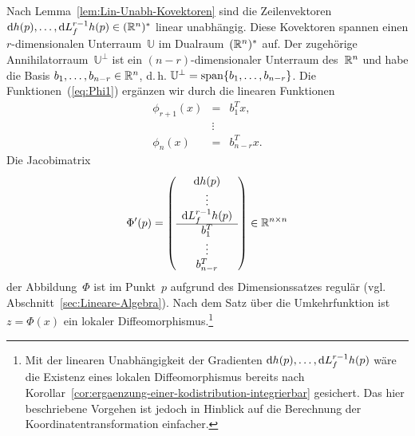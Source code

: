 \begin{svmultproof2}
Nach Lemma~\ref{lem:Lin-Unabh-Kovektoren} sind die Zeilenvektoren
${\mathrm{d}} h(p),\ldots,{\mathrm{d}} L_{f}^{r-1}h(p)\in({\mathbb{R}}^{n})^{*}$ linear unabhängig.
Diese Kovektoren spannen einen $r$-dimensionalen Unterraum~$\mathbb{U}$
im Dualraum~$({\mathbb{R}}^{n})^{*}$ auf. Der zugehörige Annihilatorraum~$\mathbb{U}^{\perp}$
ist ein $(n-r)$-dimensionaler Unterraum des~${\mathbb{R}}^{n}$ und habe die
Basis $b_{1},\ldots,b_{n-r}\in{\mathbb{R}}^{n}$, d.\,h. $\mathbb{U}^{\perp}={\operatorname{span}}\{b_{1},\ldots,b_{n-r}\}$.
Die Funktionen~(\ref{eq:Phi1}) ergänzen wir durch die linearen Funktionen
\begin{equation}
\begin{array}{rcl}
\phi_{r+1}(x) & = & b_{1}^{T}x,\\
 & \vdots\\
\phi_{n}(x) & = & b_{n-r}^{T}x.
\end{array}\label{eq:Phi2}
\end{equation}
 Die Jacobimatrix 
\[
\Phi^{\prime}(p)=\left(\begin{array}{c}
\mathrm{d} h(p)\\
\vdots\\
\mathrm{d} L_{f}^{r-1}h(p)\\
\hline b_{1}^{T}\\
\vdots\\
b_{n-r}^{T}
\end{array}\right)\in{\mathbb{R}}^{n\times n}
\]
der Abbildung~$\Phi$ ist im Punkt~$p$ aufgrund des Dimensionssatzes
regulär (vgl. Abschnitt~\ref{sec:Lineare-Algebra}). Nach dem Satz
über die Umkehrfunktion ist $z=\Phi(x)$ ein lokaler Diffeomorphismus.\footnote{Mit der linearen Unabhängigkeit der Gradienten ${\mathrm{d}} h(p),\ldots,{\mathrm{d}} L_{f}^{r-1}h(p)$
wäre die Existenz eines lokalen Diffeomorphismus bereits nach Korollar~\ref{cor:ergaenzung-einer-kodistribution-integrierbar}
gesichert. Das hier beschriebene Vorgehen ist jedoch in Hinblick auf
die Berechnung der Koordinatentransformation einfacher.} 


\end{svmultproof2}
